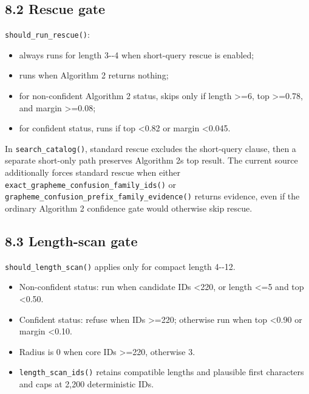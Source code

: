 \subsection{8.2 Rescue gate}\label{82-rescue-gate}

\texttt{should\_\allowbreak{}run\_\allowbreak{}rescue()}:

\begin{itemize}
\tightlist
\item
  always runs for length 3-\/-4 when short-query rescue is enabled;
\item
  runs when Algorithm 2 returns nothing;
\item
  for non-confident Algorithm 2 status, skips only if length \textgreater=6, top \textgreater=0.78, and margin \textgreater=0.08;
\item
  for confident status, runs if top \textless0.82 or margin \textless0.045.
\end{itemize}

In \texttt{search\_\allowbreak{}catalog()}, standard rescue excludes the short-query clause, then a separate short-only path preserves Algorithm 2\textquotesingle s top result. The current source additionally forces standard rescue when either \texttt{exact\_\allowbreak{}grapheme\_\allowbreak{}confusion\_\allowbreak{}family\_\allowbreak{}ids()} or \texttt{grapheme\_\allowbreak{}confusion\_\allowbreak{}prefix\_\allowbreak{}family\_\allowbreak{}evidence()} returns evidence, even if the ordinary Algorithm 2 confidence gate would otherwise skip rescue.

\subsection{8.3 Length-scan gate}\label{83-length-scan-gate}

\texttt{should\_\allowbreak{}length\_\allowbreak{}scan()} applies only for compact length 4-\/-12.

\begin{itemize}
\tightlist
\item
  Non-confident status: run when candidate IDs \textless220, or length \textless=5 and top \textless0.50.
\item
  Confident status: refuse when IDs \textgreater=220; otherwise run when top \textless0.90 or margin \textless0.10.
\item
  Radius is 0 when core IDs \textgreater=220, otherwise 3.
\item
  \texttt{length\_\allowbreak{}scan\_\allowbreak{}ids()} retains compatible lengths and plausible first characters and caps at 2,200 deterministic IDs.
\end{itemize}

